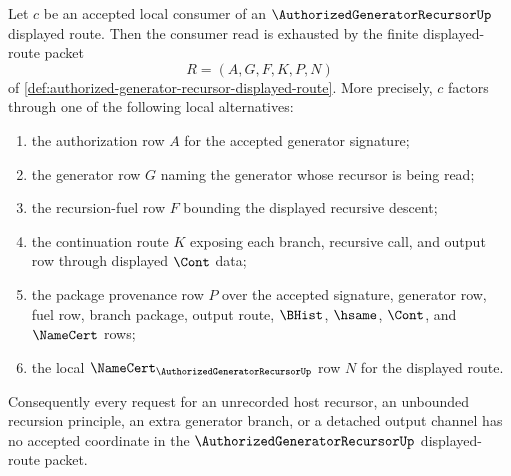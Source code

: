 \begin{lemma}
\label{lem:authorized-generator-recursor-displayed-route-downstream-coverage}
Let $c$ be an accepted local consumer of an $\AuthorizedGeneratorRecursorUp$ displayed route. Then the consumer read is exhausted by the finite displayed-route packet
$$
R=(A,G,F,K,P,N)
$$
of \autoref{def:authorized-generator-recursor-displayed-route}. More precisely, $c$ factors through one of the following local alternatives:
\begin{enumerate}
\item the authorization row $A$ for the accepted generator signature;
\item the generator row $G$ naming the generator whose recursor is being read;
\item the recursion-fuel row $F$ bounding the displayed recursive descent;
\item the continuation route $K$ exposing each branch, recursive call, and output row through displayed $\Cont$ data;
\item the package provenance row $P$ over the accepted signature, generator row, fuel row, branch package, output route, $\BHist$, $\hsame$, $\Cont$, and $\NameCert$ rows;
\item the local $\NameCert_{\AuthorizedGeneratorRecursorUp}$ row $N$ for the displayed route.
\end{enumerate}
Consequently every request for an unrecorded host recursor, an unbounded recursion principle, an extra generator branch, or a detached output channel has no accepted coordinate in the $\AuthorizedGeneratorRecursorUp$ displayed-route packet.
\end{lemma}
